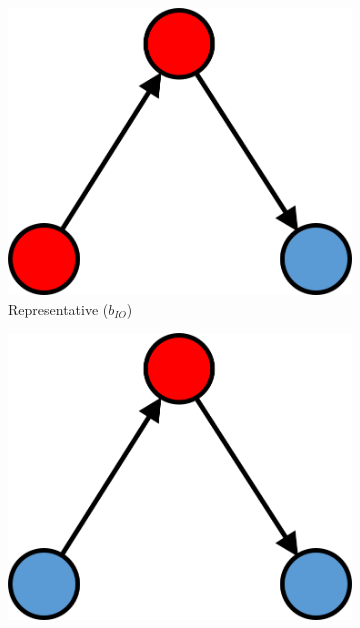 \begin{figure}[hbt!]
\begin{subfigure}[b]{0.25\textwidth}
  \end{subfigure}
  \hspace{2em}
  \begin{subfigure}[b]{0.25\textwidth}
    \includegraphics[width=\textwidth]{Images/b_IO.png}
    \caption{Representative ($b_{IO}$)}
    \label{fig:3}
  \end{subfigure}
  \par \bigskip
  \begin{subfigure}[b]{0.25\textwidth}
    \includegraphics[width=\textwidth]{Images/w_O.png}

\end{subfigure}
\end{figure}
